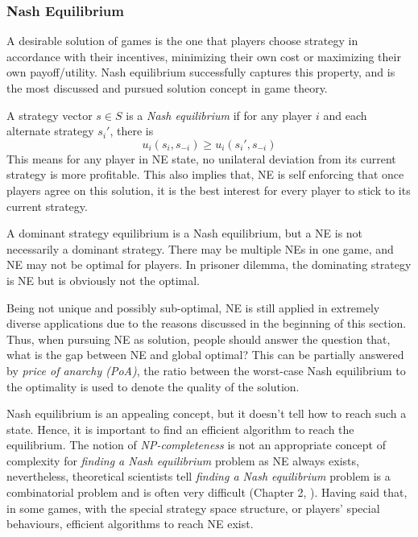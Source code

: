 \subsubsection*{Nash Equilibrium}
A desirable solution of games is the one that players choose strategy in accordance with their incentives, minimizing their own cost or maximizing their own payoff/utility.
Nash equilibrium successfully captures this property, and is the most discussed and pursued solution concept in game theory.

A strategy vector $s\in S$ is a \textit{Nash equilibrium} if for any player $i$ and each alternate strategy $s_i'$, there is
 \[ u_i(s_i, s_{-i}) \geq u_i(s_i', s_{-i})\]
This means for any player in NE state, no unilateral deviation from its current strategy is more profitable.
This also implies that, NE is self enforcing that once players agree on this solution, it is the best interest for every player to stick to its current strategy.

A dominant strategy equilibrium is a Nash equilibrium, but a NE is not necessarily a dominant strategy.
There may be multiple NEs in one game, and NE may not be optimal for players. 
In prisoner dilemma, the dominating strategy is NE but is obviously not the optimal.


Being not unique and possibly sub-optimal, NE is still applied in extremely diverse applications due to the reasons discussed in the beginning of this section.
Thus, when pursuing NE as solution, people should answer the question that, what is the gap between NE and global optimal?
This can be partially answered by \textit{price of anarchy (\gls{PoA})}, the ratio between the worst-case Nash equilibrium to the optimality is used to denote the quality of the solution.

Nash equilibrium is an appealing concept, but it doesn't tell how to reach such a state.
Hence, it is important to find an efficient algorithm to reach the equilibrium.
The notion of \textit{NP-completeness} is not an appropriate concept of complexity for \textit{finding a Nash equilibrium} problem as NE always exists, nevertheless, theoretical scientists tell \textit{finding a Nash equilibrium} problem is a combinatorial problem and is often very difficult (Chapter 2, \cite{agt_book}).
Having said that, in some games, with the special strategy space structure, or players' special behaviours, efficient algorithms to reach NE exist.





